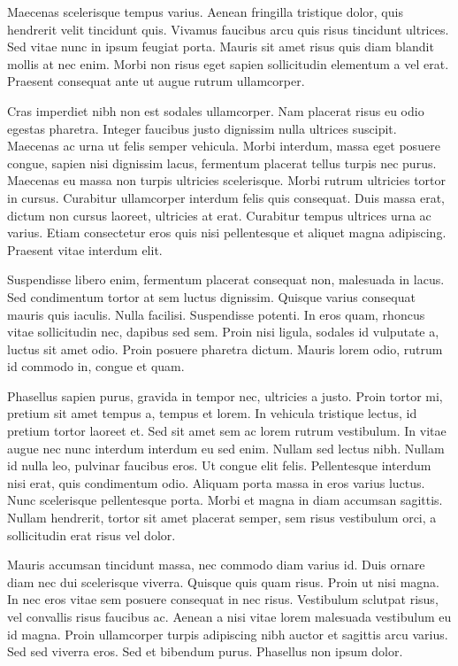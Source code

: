 \documentclass[twoside]{pracaInzynierskaMS}
\begin{document}
Maecenas scelerisque tempus varius. Aenean fringilla tristique dolor, quis hendrerit velit tincidunt quis. Vivamus faucibus arcu quis risus tincidunt ultrices. Sed vitae nunc in ipsum feugiat porta. Mauris sit amet risus quis diam blandit mollis at nec enim. Morbi non risus eget sapien sollicitudin elementum a vel erat. Praesent consequat ante ut augue rutrum ullamcorper. 

 Cras imperdiet nibh non est sodales ullamcorper. Nam placerat risus eu odio egestas pharetra. Integer faucibus justo dignissim nulla ultrices suscipit. Maecenas ac urna ut felis semper vehicula. Morbi interdum, massa eget posuere congue, sapien nisi dignissim lacus, fermentum placerat tellus turpis nec purus. Maecenas eu massa non turpis ultricies scelerisque. Morbi rutrum ultricies tortor in cursus. Curabitur ullamcorper interdum felis quis consequat. Duis massa erat, dictum non cursus laoreet, ultricies at erat. Curabitur tempus ultrices urna ac varius. Etiam consectetur eros quis nisi pellentesque et aliquet magna adipiscing. Praesent vitae interdum elit. 

 Suspendisse libero enim, fermentum placerat consequat non, malesuada in lacus. Sed condimentum tortor at sem luctus dignissim. Quisque varius consequat mauris quis iaculis. Nulla facilisi. Suspendisse potenti. In eros quam, rhoncus vitae sollicitudin nec, dapibus sed sem. Proin nisi ligula, sodales id vulputate a, luctus sit amet odio. Proin posuere pharetra dictum. Mauris lorem odio, rutrum id commodo in, congue et quam. 

 Phasellus sapien purus, gravida in tempor nec, ultricies a justo. Proin tortor mi, pretium sit amet tempus a, tempus et lorem. In vehicula tristique lectus, id pretium tortor laoreet et. Sed sit amet sem ac lorem rutrum vestibulum. In vitae augue nec nunc interdum interdum eu sed enim. Nullam sed lectus nibh. Nullam id nulla leo, pulvinar faucibus eros. Ut congue elit felis. Pellentesque interdum nisi erat, quis condimentum odio. Aliquam porta massa in eros varius luctus. Nunc scelerisque pellentesque porta. Morbi et magna in diam accumsan sagittis. Nullam hendrerit, tortor sit amet placerat semper, sem risus vestibulum orci, a sollicitudin erat risus vel dolor. 

 Mauris accumsan tincidunt massa, nec commodo diam varius id. Duis ornare diam nec dui scelerisque viverra. Quisque quis quam risus. Proin ut nisi magna. In nec eros vitae sem posuere consequat in nec risus. Vestibulum sclutpat risus, vel convallis risus faucibus ac. Aenean a nisi vitae lorem malesuada vestibulum eu id magna. Proin ullamcorper turpis adipiscing nibh auctor et sagittis arcu varius. Sed sed viverra eros. Sed et bibendum purus. Phasellus non ipsum dolor.
       
\end{document}
